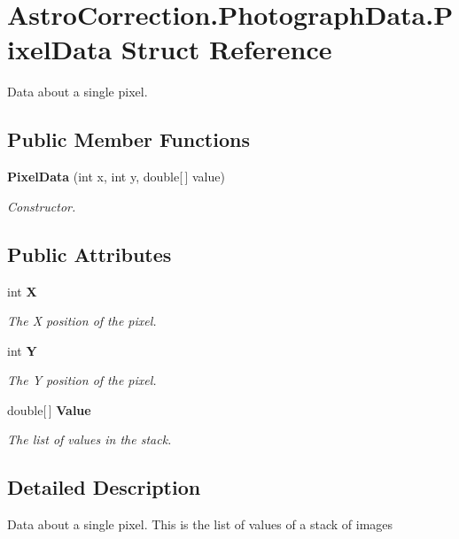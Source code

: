 \section{AstroCorrection.PhotographData.PixelData Struct Reference}
\label{struct_astro_correction_1_1_photograph_data_1_1_pixel_data}


Data about a single pixel.  
\subsection*{Public Member Functions}
\begin{DoxyCompactItemize}
\item 
{\bf PixelData} (int x, int y, double[$\,$] value)
\begin{DoxyCompactList}\small\item\em Constructor. \item\end{DoxyCompactList}\end{DoxyCompactItemize}
\subsection*{Public Attributes}
\begin{DoxyCompactItemize}
\item 
int {\bf X}
\begin{DoxyCompactList}\small\item\em The X position of the pixel. \item\end{DoxyCompactList}\item 
int {\bf Y}
\begin{DoxyCompactList}\small\item\em The Y position of the pixel. \item\end{DoxyCompactList}\item 
double[$\,$] {\bf Value}
\begin{DoxyCompactList}\small\item\em The list of values in the stack. \item\end{DoxyCompactList}\end{DoxyCompactItemize}


\subsection{Detailed Description}
Data about a single pixel. This is the list of values of a stack of images 

